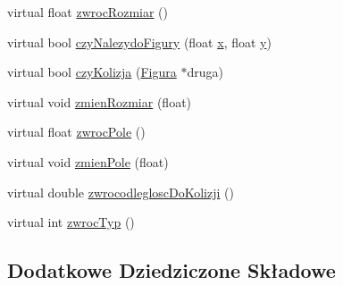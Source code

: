 \begin{DoxyCompactItemize}
\item 
virtual float \hyperlink{classKwadrat_a2cd11e92113cab623bf2fbee5e983da9}{zwroc\-Rozmiar} ()
\item 
virtual bool \hyperlink{classKwadrat_ad2eea84aafada7c9f9a6deea1d28dd0b}{czy\-Nalezydo\-Figury} (float \hyperlink{classFigura_ad640a05ebb1ddbf595124f0b31793e8a}{x}, float \hyperlink{classFigura_ab17e5953f2898eb729b2dc506640bce2}{y})
\item 
virtual bool \hyperlink{classKwadrat_a892c42c9fe7265a8bf5209f2dac0291d}{czy\-Kolizja} (\hyperlink{classFigura}{Figura} $\ast$druga)
\item 
virtual void \hyperlink{classKwadrat_a5053f4a588bb04063c5b72398450f006}{zmien\-Rozmiar} (float)
\item 
virtual float \hyperlink{classKwadrat_a70746db00ffc11e8c587ad188e3c9f43}{zwroc\-Pole} ()
\item 
virtual void \hyperlink{classKwadrat_ad4aa4af07a2567679cea1a2aff08e157}{zmien\-Pole} (float)
\item 
virtual double \hyperlink{classKwadrat_a4349f00bc44e9848a495045fafea259b}{zwrocodleglosc\-Do\-Kolizji} ()
\item 
virtual int \hyperlink{classKwadrat_a496886971ae7c8987edb607cfde3823f}{zwroc\-Typ} ()
\end{DoxyCompactItemize}
\subsection*{Dodatkowe Dziedziczone Składowe}


